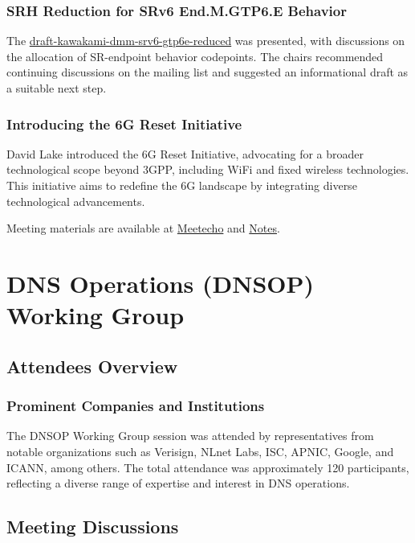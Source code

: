 \documentclass{article}
\begin{document}
\subsubsection{SRH Reduction for SRv6 End.M.GTP6.E Behavior}
The \href{https://datatracker.ietf.org/doc/draft-kawakami-dmm-srv6-gtp6e-reduced}{draft-kawakami-dmm-srv6-gtp6e-reduced} was presented, with discussions on the allocation of SR-endpoint behavior codepoints. The chairs recommended continuing discussions on the mailing list and suggested an informational draft as a suitable next step.

\subsubsection{Introducing the 6G Reset Initiative}
David Lake introduced the 6G Reset Initiative, advocating for a broader technological scope beyond 3GPP, including WiFi and fixed wireless technologies. This initiative aims to redefine the 6G landscape by integrating diverse technological advancements.

Meeting materials are available at \href{https://meetings.conf.meetecho.com/ietf121/?group=dmm&short=dmm&item=1}{Meetecho} and \href{https://notes.ietf.org/notes-ietf-121-dmm}{Notes}.




\newpage

\section{DNS Operations (DNSOP) Working Group}

\subsection{Attendees Overview}
\subsubsection{Prominent Companies and Institutions}
The DNSOP Working Group session was attended by representatives from notable organizations such as Verisign, NLnet Labs, ISC, APNIC, Google, and ICANN, among others. The total attendance was approximately 120 participants, reflecting a diverse range of expertise and interest in DNS operations.

\subsection{Meeting Discussions}
\end{document}
